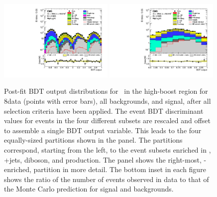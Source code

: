 \documentclass[11pt,twoside,a4paper,cmspaper,final,collab]{cms-tdr}
\begin{document}
\begin{figure}[htbp]
  \begin{center}
    \includegraphics[width=0.49\textwidth]{BDT_Znn_HighPt_ZnunuHighPt_8TeV_PostFit_s}
    \includegraphics[width=0.49\textwidth]{BDT_Znn_HighPt_Last_ZnunuHighPt_8TeV_PostFit_s}
\caption{Post-fit BDT output distributions for \ZnnH\ in the
      high-boost region for 8\TeV data (points with error bars), all
    backgrounds, and signal, after all selection criteria have been
    applied. The event BDT discriminant values for events in the four
    different subsets are rescaled and offset to assemble a single BDT output variable.
This leads to the four equally-sized partitions shown in the \cmsLeft
panel. The partitions correspond, starting from the left, to the event
subsets enriched in \ttbar, {\Vvar}+jets, diboson, and \VH production.
The \cmsRight panel shows the right-most, \VH-enriched, partition in more detail.
The bottom inset in each figure shows the ratio of the number of events observed in data to that of the Monte Carlo prediction for signal and backgrounds.}
    \label{fig:mBDT_Znn_example}
  \end{center}
\end{figure}
\end{document}
